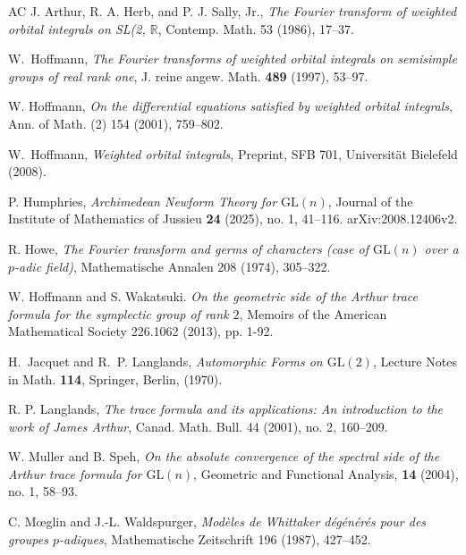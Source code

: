 \documentclass[11pt]{amsart}
\newcommand{\GGL}{\mathrm{GL}}
\theoremstyle{definition}
\numberwithin{equation}{section}
\begin{document}
\begin{thebibliography}{AC}
         J. Arthur, R. A. Herb, and P. J. Sally, Jr., \textit{The Fourier transform of weighted orbital integrals on SL(2, \(\mathbb{R}\)}, Contemp. Math. 53 (1986), 17--37.

         W.~Hoffmann, \textit{The Fourier transforms of weighted orbital integrals on semisimple groups of real rank one}, J. reine angew. Math. \textbf{489} (1997), 53--97.
		
		W. Hoffmann, \textit{On the differential equations satisfied by weighted orbital integrals}, Ann. of Math. (2) 154 (2001), 759--802.
		
		 W.~Hoffmann, \emph{Weighted orbital integrals}, Preprint, SFB 701, Universität Bielefeld (2008).
		
		
		
		
		
		P. Humphries, \textit{Archimedean Newform Theory for \(\mathrm{GL}(n)\)}, Journal of the Institute of Mathematics of Jussieu \textbf{24} (2025), no. 1, 41--116.  arXiv:2008.12406v2.
		
		
		 R. Howe, \textit{The Fourier transform and germs of characters (case of \(\mathrm{GL}(n)\) over a \(p\)-adic field)}, Mathematische Annalen 208 (1974), 305–322.

         W. Hoffmann and S. Wakatsuki. \textit{On the geometric side of the Arthur trace formula for the
			symplectic group of rank $2$}, Memoirs of the American Mathematical Society
		226.1062 (2013), pp. 1-92.
		
		 H.~Jacquet and R.~P. Langlands, \emph{Automorphic Forms on \(\GGL(2)\)}, Lecture Notes in Math. \textbf{114}, Springer, Berlin, (1970).
		
		R. P. Langlands, \textit{The trace formula and its applications: An introduction to the work of James Arthur}, Canad. Math. Bull. 44 (2001), no. 2, 160--209.
		
		
		W. Muller and B. Speh,
		\textit{On the absolute convergence of the spectral side of the Arthur trace formula for $\GGL(n)$},
		Geometric and Functional Analysis, \textbf{14} (2004), no. 1, 58--93.
		
		
		 C. Mœglin and J.-L. Waldspurger, \textit{Modèles de Whittaker dégénérés pour des groupes \(p\)-adiques}, Mathematische Zeitschrift 196 (1987), 427–452.
		

\end{thebibliography}
\end{document}
